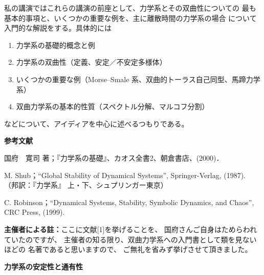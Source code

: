 \documentclass[uplatex,dvipdfmx]{jlreq}
\begin{document}
私の講演ではこれらの講演の前座として、力学系とその双曲性についての
最も基本的事項と、いくつかの重要な例を、主に離散時間の力学系の場合
について入門的な解説をする。具体的には
\begin{enumerate}
\item 力学系の基礎的概念と例
\item 力学系の双曲性（定義、安定／不安定多様体）
\item いくつかの重要な例（Morse--Smale 系、双曲的トーラス自己同型、馬蹄力学系）
\item 双曲力学系の基本的性質（スペクトル分解、マルコフ分割）
\end{enumerate}
などについて、アイディアを中心に述べるつもりである。

\bigskip
\noindent\textbf{参考文献}
\begin{enumerate}[{[1]}]
\item 国府　寛司 著；『力学系の基礎』、カオス全書2、朝倉書店、(2000)．
\item M. Shub；``Global Stability of Dynamical Systems'', Springer-Verlag, (1987).
（邦訳：『力学系』 上・下、シュプリンガー東京）
\item C. Robinson；``Dynamical Systems, Stability, Symbolic Dynamics, and Chaos'',
CRC Press, (1999).
\end{enumerate}

\noindent\textbf{主催者による註：}ここに文献[1]を挙げることを、
国府さんご自身はためらわれていたのですが、
主催者の知る限り、双曲力学系への入門書として類を見ないほどの
名著であると思いますので、
ご無礼を省みず挙げさせて頂きました。

\newpage

\begin{center}
{\large\bfseries 力学系の安定性と通有性}\\[6pt]
\hspace*{\fill}{\large\bfseries 林 修平（東京大学 大学院数理科学研究科）}
\end{center}
\vspace{1pc}
\end{document}
